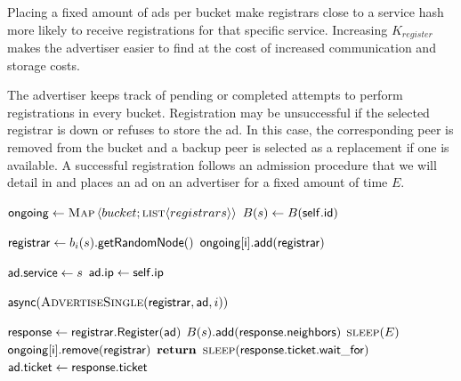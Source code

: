 Placing a fixed amount of ads per bucket make registrars close to a service hash more likely to receive registrations for that specific service. 
Increasing $K_\textit{register}$ makes the advertiser easier to find at the cost of increased communication and storage costs.

The advertiser keeps track of pending or completed attempts to perform registrations in every bucket.
Registration may be unsuccessful if the selected registrar is down or refuses to store the ad.
In this case, the corresponding peer is removed from the bucket and a backup peer is selected as a replacement if one is available.
A successful registration follows an admission procedure that we will detail in  and places an ad on an advertiser for a fixed amount of time $E$.

\begin{algorithm}[]%
    \caption{%
        Advertisement algorithm run by advertisers.
    }%
    \label{alg:advertise}%
    \begin{algorithmic}[1]%
         \footnotesize
        \State $\mathsf{ongoing} \gets  \textsc{Map}\left \langle bucket;\textsc{list}\langle registrars \rangle \right \rangle$
        \State $B(s) \gets B(\mathsf{self.id})$
        \item[]
                    \State $\mathsf{registrar} \gets b_i(s)\mathsf{.getRandomNode()}$
                    \State $\mathsf{ongoing[i].add}(\mathsf{registrar})$
                                   
                    \State $\mathsf{ad.service} \gets s$
                    \State $\mathsf{ad.ip} \gets \mathsf{self.ip}$

                    \State $\algvar{async}(\Call{AdvertiseSingle}{\algvar{registrar}, \algvar{ad}, i})$
                \EndIf
            \EndFor
        \EndProcedure
        \item[]
                \State $\mathsf{response} \gets \mathsf{registrar.Register(ad)}$
                \State $B(s)\mathsf{.add}(\mathsf{response.neighbors})$
                    \State $\Call{sleep}{E}$
                    \State $\mathsf{ongoing[i].remove}(\mathsf{registrar})$
                    \State $\Return$
                    \State $\Call{sleep}{\algvar{response.ticket.wait\_for}}$
                    \State $\mathsf{ad.ticket} \gets \mathsf{response.ticket}$
                \EndIf
            \EndWhile

        \EndProcedure
    \end{algorithmic}%
\end{algorithm}%

